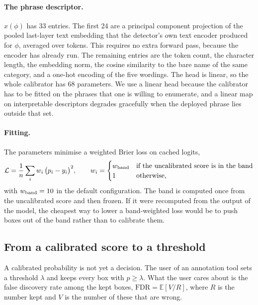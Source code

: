 \paragraph{The phrase descriptor.} $x(\phi)$ has 33 entries. The first 24 are a principal
component projection of the pooled last-layer text embedding that the detector's own text
encoder produced for $\phi$, averaged over tokens. This requires no extra forward pass, because
the encoder has already run. The remaining entries are the token count, the character length,
the embedding norm, the cosine similarity to the bare name of the same category, and a one-hot
encoding of the five wordings. The head is linear, so the whole calibrator has 68 parameters. We
use a linear head because the calibrator has to be fitted on the phrases that one is willing to
enumerate, and a linear map on interpretable descriptors degrades gracefully when the deployed
phrase lies outside that set.

\paragraph{Fitting.} The parameters minimise a weighted Brier loss on cached logits,
\begin{equation}
\mathcal{L} = \frac{1}{n}\sum_i w_i\,\big(p_i - y_i\big)^2 ,
\qquad
w_i = \begin{cases} w_{\rm band} & \text{if the uncalibrated score is in the band}\\ 1 & \text{otherwise,}\end{cases}
\end{equation}
with $w_{\rm band}=10$ in the default configuration. The band is computed once from the
uncalibrated score and then frozen. If it were recomputed from the output of the model, the
cheapest way to lower a band-weighted loss would be to push boxes out of the band rather than to
calibrate them.

\subsection{From a calibrated score to a threshold}

A calibrated probability is not yet a decision. The user of an annotation tool sets a threshold
$\lambda$ and keeps every box with $p\geq\lambda$. What the user cares about is the false
discovery rate among the kept boxes, $\mathrm{FDR}=\mathbb{E}[V/R]$, where $R$ is the number
kept and $V$ is the number of these that are wrong.


